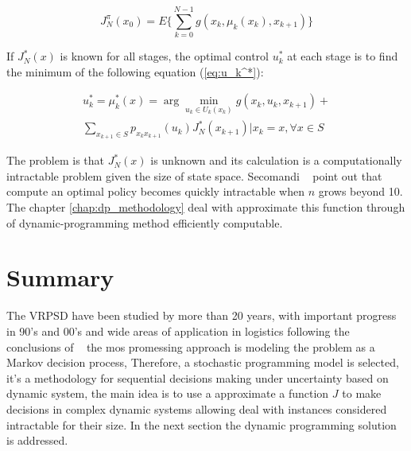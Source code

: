 \begin{equation}\label{eq:SDP_obj_VRPSD}
 J_N^\pi(x_0)=E\biggr\{\sum_{k=0}^{N-1}g(x_k,\mu_k(x_k),x_{k+1})\biggr\}
\end{equation}

If $J_N^*(x)$ is known for all stages, the optimal control $u_k^*$ at each stage is to find the minimum of the following equation (\ref{eq:u_k^*}):

\begin{multline}\label{eq:u_k^*}
     u_k^*=\mu_k^*(x)=
\arg\min\limits_{u_k \in U_k(x_k)}g(x_k,u_k,x_{k+1})+\\
\sum_{x_{k+1}\in S}p_{x_kx_{k+1}}(u_k)J_N^*(x_{k+1})|x_k=x, \forall x\in S
\end{multline}

The problem is that $J_N^*(x)$ is unknown and its calculation is a computationally intractable problem given the size of state space. Secomandi ~\cite{secomandi_rollout_2001} point out that compute an optimal policy becomes quickly intractable when $n$ grows beyond 10. The chapter \ref{chap:dp_methodology} deal with approximate this function through of dynamic-programming method efficiently computable.

\section{Summary}

The VRPSD have been studied by more than 20 years, with important progress in 90's and 00's and wide areas of application in logistics following the conclusions of ~\cite{Dror_2005} the mos promessing approach is modeling the problem as a Markov decision process, Therefore, a stochastic programming model is selected, it's a methodology for sequential decisions making under uncertainty based on dynamic system, the main idea is to use a approximate a function $J$ to make decisions in complex dynamic systems allowing deal with instances considered intractable for their size. In the next section the dynamic programming solution is addressed.
